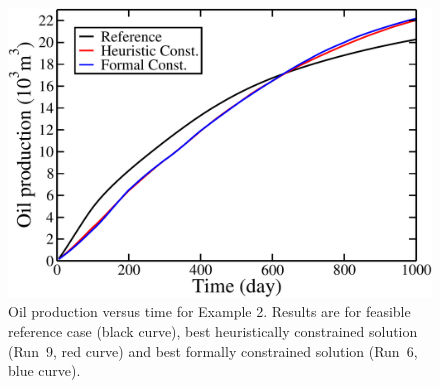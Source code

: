 \documentclass[twocolumn,numbook]{svjour3}          %
\begin{document}
\begin{figure} [ht]
\begin{center}
\includegraphics[totalheight=2.17in,angle=0]{spe10TopLayerRevenue.pdf}
\end{center}
\caption{Oil production versus time for Example 2. Results are for
  feasible reference case (black curve), best heuristically constrained solution (Run~9, red curve)
  and best formally constrained solution (Run~6, blue curve).}
\label{fig:SPE10TopLayerRevenue}
\end{figure}
\end{document}
